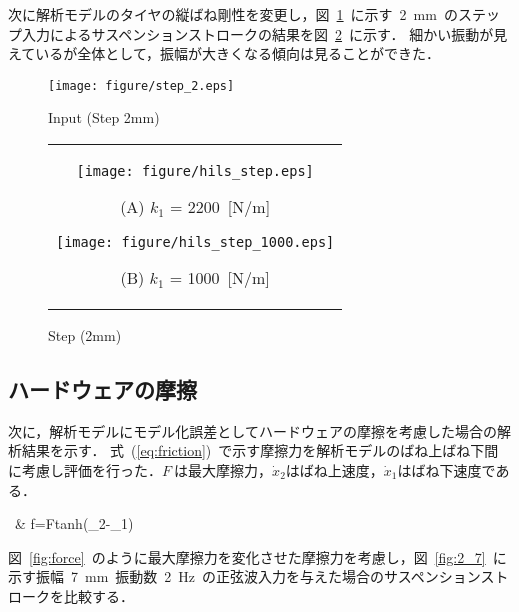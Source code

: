 \documentclass[a4paper,12pt]{article_vdlab_sotsuron}
\begin{document}
\newpage
次に解析モデルのタイヤの縦ばね剛性を変更し，図~\ref{fig:step_2_}~に示す~2~mm~のステップ入力によるサスペンションストロークの結果を図~\ref{fig:step_1000}~に示す．
細かい振動が見えているが全体として，振幅が大きくなる傾向は見ることができた．

\vspace{10mm}
\begin{figure}[h]
  \begin{center}
   \texttt{[image: figure/step\_2.eps]}
  \vspace{2mm}
  \caption{Input (Step 2mm)}
  \end{center}
  \label{fig:step_2_}
\end{figure}

\vspace{10mm}
\begin{figure}[h]
    \begin{tabular}{c}
      \begin{minipage}{0.45\hsize}
	\begin{center}
	  \texttt{[image: figure/hils\_step.eps]}
	\end{center}
	\begin{center}
	  \vspace{2mm}
	  \ (A) $k_1$ = 2200~[N/m]\
	  \end{center}
      \end{minipage}
      \begin{minipage}{0.5\hsize}
	\begin{center}
	  \texttt{[image: figure/hils\_step\_1000.eps]}
	\end{center}
	\begin{center}
	  \vspace{2mm}
	  \ (B) $k_1$ = 1000~[N/m]\
	  \end{center}
      \end{minipage}
    \end{tabular}
    \vspace{2mm}
    \caption{Step (2mm)}
    \label{fig:step_1000}
\end{figure}



\newpage
\subsection{ハードウェアの摩擦}
次に，解析モデルにモデル化誤差としてハードウェアの摩擦を考慮した場合の解析結果を示す．
式~(\ref{eq:friction})~で示す摩擦力を解析モデルのばね上ばね下間に考慮し評価を行った．$F~$は最大摩擦力，$\dot{x}_2$はばね上速度，$\dot{x}_1$はばね下速度である．
\vspace*{-2mm}
\begin{flalign}
\label{eq:friction}
\ & f=Ftanh(_2-_1)
\end{flalign}
\vspace*{-4mm}
\par
図~\ref{fig:force}~のように最大摩擦力を変化させた摩擦力を考慮し，図~\ref{fig:2_7}~に示す振幅~7~mm~振動数~2~Hz~の正弦波入力を与えた場合のサスペンションストロークを比較する．
\end{document}

